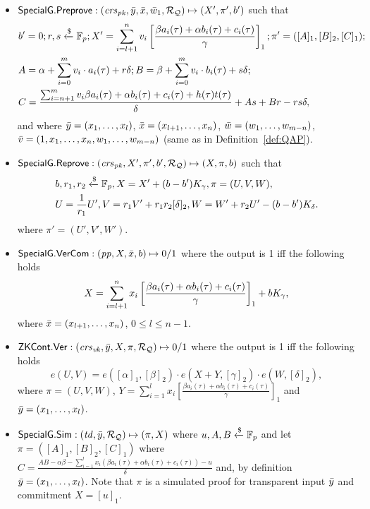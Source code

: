 \begin{definition}
\begin{itemize}
\item ${\mathsf{SpecialG}}.{\mathsf{Preprove}}: (\mathit{crs}_{\mathit{pk}}, \bar{y}, \bar{x}, \bar{w}_1, \mathcal{R}_{\mathcal{Q}}) \mapsto (X', \pi', b')$ such that \\
\begin{align*}
&b' = 0; r, s\xleftarrow{\$} \mathbb{F}_p; X' = \sum_{i=l+1}^{n} v_i\left[ \frac{\beta a_i(\tau)+ \alpha b_i(\tau)+ c_i(\tau)}{\gamma} \right]_1; \pi' = ([A]_1, [B]_2, [C]_1); \\
&A = \alpha + \sum_{i=0}^{m} v_i \cdot a_i(\tau) + r\delta; B = \beta + \sum_{i=0}^{m} v_i \cdot b_i(\tau) + s\delta; \\ 
&C = \frac{\sum_{i=n+1}^{m} v_i \beta a_i(\tau)+ \alpha b_i(\tau)+ c_i(\tau) + h(\tau)t(\tau)}{\delta}   + As + Br - rs\delta, 
\end{align*}
and where $\bar{y} = (x_1, \ldots, x_l)$, $\bar{x} = (x_{l+1}, \ldots, x_n)$, $\bar{w} = (w_1, \ldots, w_{m-n})$, \\
$\bar{v} = (1, x_1, \ldots, x_n, w_1, \ldots, w_{m-n})$ (same as in Definition~\ref{def:QAP}).


\item ${\mathsf{SpecialG}}.{\mathsf{Reprove}}: (\mathit{crs}_{\mathit{pk}}, X', \pi', b', \mathcal{R}_{\mathcal{Q}}) \mapsto (X, \pi, b)$  such that
\begin{align*}
&b , r_1, r_2  \xleftarrow{\$} \mathbb{F}_p, X = X' + (b- b') K_{\gamma}, \pi = (U, V, W), \\
&U = \frac{1}{r_1} U', V = r_1 V' + r_1r_2[\delta]_2, W = W' + r_2U'  - (b - b') K_{\delta} .
\end{align*}
\noindent where $\pi' = (U', V', W')$.
 
\item ${\mathsf{SpecialG}}.{\mathsf{VerCom}}: (\mathit{pp}, X, \bar{x}, b) \mapsto 0/1$ where the output is 1 iff the following holds
$$X = \sum_{i=l+1}^{n} x_i\left[ \frac{\beta a_i(\tau)+ \alpha b_i(\tau)+ c_i(\tau)}{\gamma} \right]_1  + b K_{\gamma},$$
where $\bar{x} = (x_{l+1}, \ldots, x_n)$, $ 0 \leq l \leq n-1$. 

\item ${\mathsf{ZKCont}}.{\mathsf{Ver}}: (\mathit{crs}_{\mathit{vk}}, \bar{y}, X, \pi, \mathcal{R}_{\mathcal{Q}}) \mapsto 0/1$ where the output is 1 iff the following holds 
$$e(U,V) = e([\alpha]_1, [\beta]_2) \cdot e(X + Y, [\gamma]_2) \cdot e(W, [\delta]_2),$$
where $\pi = (U, V, W)$, $Y = \sum_{i=1}^{l} x_i\left[ \frac{\beta a_i(\tau)+ \alpha b_i(\tau)+ c_i(\tau)}{\gamma} \right]_1$ 
and $\bar{y} = (x_1, \ldots, x_l)$.

\item ${\mathsf{SpecialG}}.{\mathsf{Sim}}: (\mathit{td}, \bar{y}, \mathcal{R}_{\mathcal{Q}}) \mapsto (\pi, X)$ where $u, A, B \xleftarrow {\$} \mathbb{F}_p$ and let \\
$\pi = ([A]_1, [B]_2, [C]_1)$ where $C = \frac{AB - \alpha \beta - \sum_{i=1}^{l} x_i (\beta a_i(\tau)+ \alpha b_i(\tau)+ c_i(\tau))- u}{\delta}  $ and, 
by definition $\bar{y} = (x_1, \ldots, x_l)$. Note that $\pi$ is a simulated proof for transparent input $\bar{y}$ and commitment $X = [u]_1$.
\end{itemize} 
\end{definition}

